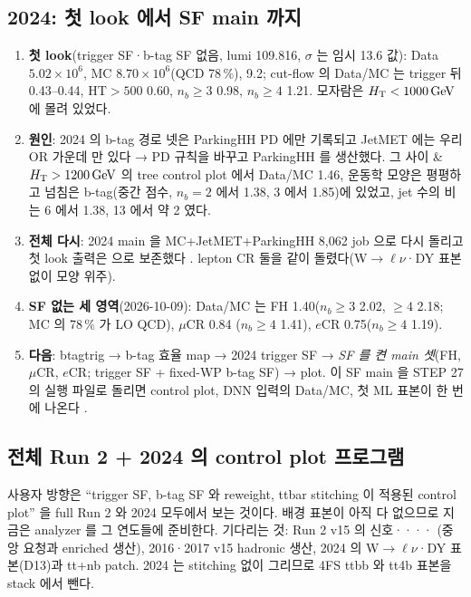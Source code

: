 \subsection{2024: 첫 look 에서 SF main 까지}
\begin{enumerate}
\item \textbf{첫 look}(trigger SF·b-tag SF 없음, lumi 109.816\fbinv, $\sigma$ 는 임시 13.6\TeV{} 값): Data $5.02\times10^6$,
      MC $8.70\times10^6$(QCD 78\,\%), \ttHH{} 9.2; cut-flow 의 Data/MC 는 trigger 뒤 0.43–0.44, HT$>500$ 0.60, $n_b\ge3$ 0.98, $n_b\ge4$ 1.21.
      모자람은 $H_{\mathrm{T}}<1000\,\mathrm{GeV}$ 에 몰려 있었다.
\item \textbf{원인}: 2024 의 b-tag 경로 넷은 ParkingHH PD 에만 기록되고 JetMET 에는 우리 OR 가운데  만 있다 → PD 규칙을 바꾸고
      ParkingHH 를 생산했다. 그 사이  \& $H_{\mathrm{T}}>1200\,\mathrm{GeV}$ 의 tree control plot 에서 Data/MC 1.46, 운동학 모양은
      평평하고 넘침은 b-tag(중간 점수, $n_b=2$ 에서 1.38, 3 에서 1.85)에 있었고, jet 수의 비는 6 에서 1.38, 13 에서 약 2 였다.
\item \textbf{전체 다시}: 2024 main 을 MC+JetMET+ParkingHH 8,062 job 으로 다시 돌리고 첫 look 출력은  으로 보존했다
      . lepton CR 둘을 같이 돌렸다(W$\to\ell\nu$·DY 표본 없이 모양 위주).
\item \textbf{SF 없는 세 영역}(2026-10-09): Data/MC 는 FH  1.40($n_b\ge3$ 2.02, $\ge4$ 2.18; MC 의 78\,\% 가 LO QCD), $\mu$CR 0.84
      ($n_b\ge4$ 1.41), $e$CR 0.75($n_b\ge4$ 1.19).
\item \textbf{다음}: btagtrig → b-tag 효율 map → 2024 trigger SF → \emph{SF 를 켠 main 셋}(FH, $\mu$CR, $e$CR; trigger SF + fixed-WP b-tag SF)
      → plot. 이 SF main 을 STEP 27 의 실행 파일로 돌리면 control plot, DNN 입력의 Data/MC, 첫 ML 표본이 한 번에 나온다
      .
\end{enumerate}

\subsection{전체 Run 2 + 2024 의 control plot 프로그램}
사용자 방향은 ``trigger SF, b-tag SF 와 reweight, ttbar stitching 이 적용된 control plot'' 을 full Run 2 와 2024 모두에서 보는 것이다. 배경 표본이
아직 다 없으므로 지금은 analyzer 를 그 연도들에 준비한다. 기다리는 것: Run 2 v15 의 신호····
(중앙 요청과 enriched 생산), 2016·2017 v15 hadronic 생산, 2024 의 W$\to\ell\nu$·DY 표본(D13)과 tt+nb patch. 2024 는 stitching
없이 그리므로 4FS ttbb 와 tt4b 표본을 stack 에서 뺀다.

